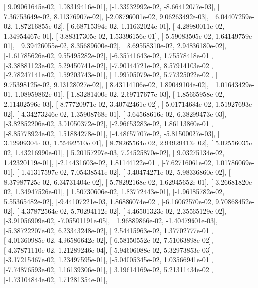 \documentclass{article}
\begin{document}
       [ 9.09061645e-02,  1.08319416e-01],
       [-1.33932992e-02, -8.66412077e-03],
       [ 7.36753649e-02,  8.11376907e-02],
       [-2.08796001e-02,  9.06263492e-03],
       [ 6.04407259e-02,  1.87216855e-02],
       [ 6.68715394e-02,  1.11632024e-01],
       [-4.28980011e-02,  1.34954467e-01],
       [ 3.88317305e-02,  1.53396156e-01],
       [-5.59083505e-02,  1.64149759e-01],
       [ 9.39426055e-02,  8.35689600e-02],
       [ 8.69558310e-02,  2.94836180e-02],
       [-1.61785626e-02,  9.55495282e-02],
       [-6.35741643e-02,  1.75578418e-01],
       [-3.38881123e-02,  5.29450741e-02],
       [-7.90144721e-02,  8.57914103e-02],
       [-2.78247141e-02,  1.69203743e-01],
       [ 1.99705079e-02,  5.77325022e-02],
       [ 9.75398125e-02,  9.13128027e-02],
       [ 8.43114106e-02,  1.89049104e-02],
       [ 1.01643429e-01,  1.08959862e-01],
       [ 1.83281400e-02,  2.69717677e-03],
       [-1.85665958e-02,  2.11402596e-03],
       [ 8.77720971e-02,  3.40742461e-02],
       [ 5.01714684e-02,  1.51927693e-02],
       [-4.34273246e-02,  1.35908768e-01],
       [ 3.64568616e-02,  6.38299473e-03],
       [-3.82852206e-02,  3.01050372e-02],
       [-2.96653283e-02,  1.86113860e-01],
       [-8.85778924e-02,  1.51884278e-01],
       [-4.48657707e-02, -5.81500027e-03],
       [ 3.12999304e-03,  1.55492510e-01],
       [-8.78265564e-02,  2.94929413e-02],
       [-5.02556035e-02,  1.43216990e-01],
       [ 5.20157297e-03,  7.24525870e-02],
       [ 9.03275134e-02,  1.42320119e-01],
       [-2.14431603e-02,  1.81144122e-01],
       [-7.62716061e-02,  1.01786069e-01],
       [-1.41317597e-02,  7.05438541e-02],
       [ 3.40474271e-02,  5.98336860e-02],
       [ 8.37987725e-02,  6.34731404e-02],
       [-5.78292168e-02,  1.62945652e-01],
       [ 3.26681820e-02,  1.34947526e-01],
       [ 1.50730606e-02,  1.83772443e-01],
       [-1.96185782e-02,  5.55365482e-02],
       [-9.44107221e-03,  1.86886074e-02],
       [-6.16062570e-02,  9.70868452e-02],
       [ 4.37872564e-02,  5.70294112e-02],
       [-4.46501323e-02,  2.35565129e-02],
       [-3.91056909e-02, -7.05501191e-05],
       [ 1.96889866e-02, -1.40479601e-03],
       [-5.38722207e-02,  6.23343248e-02],
       [ 2.54415963e-02,  1.37702777e-01],
       [-4.01360985e-02,  4.96586642e-02],
       [-6.58150552e-02,  7.51063898e-02],
       [-4.37871110e-02,  1.21289246e-04],
       [-5.94606088e-02,  5.32973853e-03],
       [-3.17215467e-02,  1.23497595e-01],
       [-5.04005345e-02,  1.03566941e-01],
       [-7.74876593e-02,  1.16139306e-01],
       [ 3.19614169e-02,  5.21311434e-02],
       [-1.73104844e-02,  1.71281354e-01],
\end{document}
